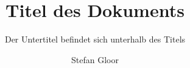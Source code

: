 \documentclass[a4paper]{book} %
\title{Titel des Dokuments}
\subtitle{Der Untertitel befindet sich unterhalb des Titels}
\author{Stefan Gloor}
\begin{document}
 
    \thispagestyle{TitlePageStyle} %
    \maketitle %
    \renewcommand{\cfttoctitlefont}{\sffamily \bfseries \Large}
    \renewcommand{\cftchapfont}{\sffamily \bfseries \large}
    \renewcommand{\cftsecfont}{\sffamily \bfseries}
    \renewcommand{\cftsubsecfont}{\sffamily}
    \renewcommand{\cftsubsubsecfont}{\sffamily}
    \renewcommand{\cftchappagefont}{\sffamily \bfseries \large}
    \renewcommand{\cftsecpagefont}{\sffamily \bfseries}
    \renewcommand{\cftsubsecpagefont}{\sffamily}
    \renewcommand{\cftsubsubsecpagefont}{\sffamily}
    \renewcommand{\cftchapaftersnum}{\bfseries\large.}
    \renewcommand{\cftsecaftersnum}{\bfseries.}
    \renewcommand{\cftsubsecaftersnum}{.}
    \renewcommand{\cftsubsubsecaftersnum}{.}
    \renewcommand{\cftbeforechapskip}{4mm}
    \renewcommand{\cftbeforesecskip}{2mm}
    \renewcommand{\cftbeforesubsecskip}{2mm}
    \renewcommand{\cftbeforesubsubsecskip}{2mm}
    \setlength{\cftbeforetoctitleskip}{0pt}
    \setlength{\cftaftertoctitleskip}{10pt}
    \tableofcontents
    \newpage
    

\end{document}
